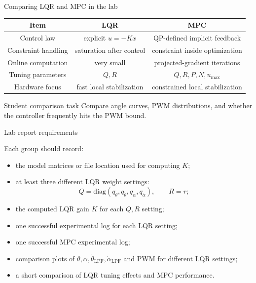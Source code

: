 \documentclass[aspectratio=169]{beamer}
\begin{document}
\begin{frame}{Comparing LQR and MPC in the lab}
\begin{center}
\begin{tabular}{c|c|c}
\hline
Item & LQR & MPC \\
\hline
Control law & explicit $u=-Kx$ & QP-defined implicit feedback \\
Constraint handling & saturation after control & constraint inside optimization \\
Online computation & very small & projected-gradient iterations \\
Tuning parameters & $Q,R$ & $Q,R,P,N,u_{\max}$ \\
Hardware focus & fast local stabilization & constrained local stabilization \\
\hline
\end{tabular}
\end{center}

\vspace{0.25cm}
\begin{block}{Student comparison task}
\small
Compare angle curves, PWM distributions, and whether the controller frequently hits the PWM bound.
\end{block}
\end{frame}

\begin{frame}{Lab report requirements}

Each group should record:
\begin{itemize}
    \item the model matrices or file location used for computing \(K\);


    \item at least three different LQR weight settings:
    \[
    Q=\mathrm{diag}(q_\theta,q_{\dot\theta},q_\alpha,q_{\dot\alpha}),
    \qquad R=r;
    \]
   

    \item the computed LQR gain \(K\) for each \(Q,R\) setting;
   

    \item one successful experimental log for each LQR setting;
   

    \item one successful MPC experimental log;
  

    \item comparison plots of \(\theta,\alpha,\dot\theta_{\mathrm{LPF}},\dot\alpha_{\mathrm{LPF}}\) and PWM for different LQR settings;
  

    \item a short comparison of LQR tuning effects and MPC performance.
\end{itemize}

\end{frame}
\end{document}
